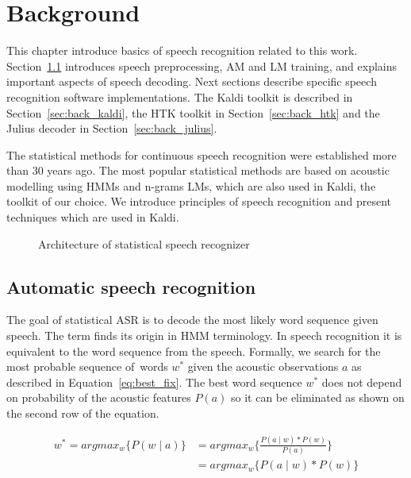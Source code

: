 \chapter{Background}
\label{cha:background}
This chapter introduce basics of speech recognition related to this work.
Section~\ref{sec:back_asr} introduces speech preprocessing, \acf{AM} and \acf{LM} training, and explains important aspects of speech decoding.
Next sections describe specific speech recognition software implementations.
The Kaldi toolkit is described in Section~\ref{sec:back_kaldi}, the \ac{HTK} toolkit in Section~\ref{sec:back_htk} and the Julius decoder in Section~\ref{sec:back_julius}.

The statistical methods for continuous speech recognition were established more than 30 years ago. 
The most popular statistical methods are based on acoustic modelling using \acp{HMM} and n-grams \acp{LM}, which are also used in Kaldi, the toolkit of our choice.
We introduce principles of speech recognition and present techniques which are used in Kaldi. 

\begin{figure}[!htp]
    \begin{center}
    
    \caption{Architecture of statistical speech recognizer\cite{ney1990acoustic}}
    \label{fig:components} 
    \end{center}
\end{figure}

\section{Automatic speech recognition}
\label{sec:back_asr}

The goal of statistical \ac{ASR} is to decode the most likely word sequence given speech.
The term  finds its origin in \acs{HMM} terminology. 
In speech recognition it is equivalent to  the word sequence from the speech. 
Formally, we search for the most probable sequence of~words $w^*$ given the acoustic observations $a$ as described in Equation~\ref{eq:best_fix}.
The best word sequence $w^*$ does not depend on probability of the acoustic features $P(a)$ so it can be eliminated as shown on the second row of the equation.

\begin{equation}\label{eq:best_fix}
    \begin{split}
    w^* = argmax_{w}\{P(w \mid a)\} &= argmax_{w}\{\frac{P(a \mid w) * P(w)}{P(a)}\} \\
                                    &= argmax_{w}\{P(a \mid w) * P(w)\}
    \end{split}
\end{equation}

